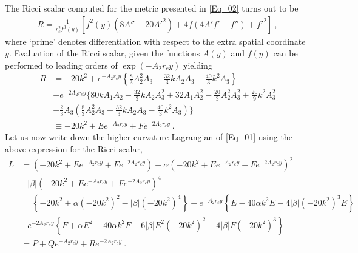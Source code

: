 \documentclass{article}
\begin{document}
The Ricci scalar computed for the metric presented in \ref{Eq_02} turns out to be
\begin{align}
R=\frac{1}{r_{c}^{2}f^{3}(y)}\left[f^{2}(y)\left(8A''-20A'^{2}\right)+4f\left(4A'f'-f'' \right)+f'^{2} \right]~,
\end{align}
where `prime' denotes differentiation with respect to the extra spatial coordinate $y$. Evaluation of the Ricci scalar, given the functions $A(y)$ and $f(y)$ can be performed to leading orders of $\exp(-A_{2}r_{c}y)$ yielding
\begin{align}
R&=-20k^{2}+e^{-A_{2}r_{c}y}\left\lbrace \frac{8}{3}A_{2}^{2}A_{3}+\frac{32}{3}kA_{2}A_{3}-\frac{40}{3}k^{2}A_{3}\right\rbrace
\nonumber
\\
&+e^{-2A_{2}r_{c}y}\Big\lbrace 80kA_{1}A_{2}-\frac{32}{3}kA_{2}A_{3}^{2}+32A_{1}A_{2}^{2}-\frac{20}{3}A_{2}^{2}A_{3}^{2}
+\frac{20}{9}k^{2}A_{3}^{2}
\nonumber
\\
&+\frac{2}{3}A_{3} \left(\frac{8}{3}A_{2}^{2}A_{3}+\frac{32}{3}kA_{2}A_{3}-\frac{40}{3}k^{2}A_{3}\right) \Big\rbrace
\nonumber
\\
&\equiv -20k^{2}+Ee^{-A_{2}r_{c}y}+Fe^{-2A_{2}r_{c}y}~.
\end{align}
Let us now write down the higher curvature Lagrangian of \ref{Eq_01} using the above expression for the Ricci scalar,
\begin{align}
L&=\left(-20k^{2}+Ee^{-A_{2}r_{c}y}+Fe^{-2A_{2}r_{c}y}\right)+\alpha \left(-20k^{2}+Ee^{-A_{2}r_{c}y}+Fe^{-2A_{2}r_{c}y}\right)^{2}
\nonumber
\\
&-|\beta|\left(-20k^{2}+Ee^{-A_{2}r_{c}y}+Fe^{-2A_{2}r_{c}y}\right)^{4}
\nonumber
\\
&=\left\lbrace -20k^{2}+\alpha \left(-20k^{2}\right)^{2}-|\beta|\left(-20k^{2}\right)^{4} \right\rbrace
+e^{-A_{2}r_{c}y}\left\lbrace E-40\alpha k^{2}E-4|\beta|\left(-20k^{2}\right)^{3}E \right\rbrace 
\nonumber
\\
&+e^{-2A_{2}r_{c}y}\left\lbrace F+\alpha E^{2}-40\alpha k^{2}F-6|\beta|E^{2}\left(-20k^{2}\right)^{2}-4|\beta|F\left(-20k^{2}\right)^{3} \right\rbrace
\nonumber
\\
&=P+Qe^{-A_{2}r_{c}y}+Re^{-2A_{2}r_{c}y}~.
\end{align}
\end{document}
